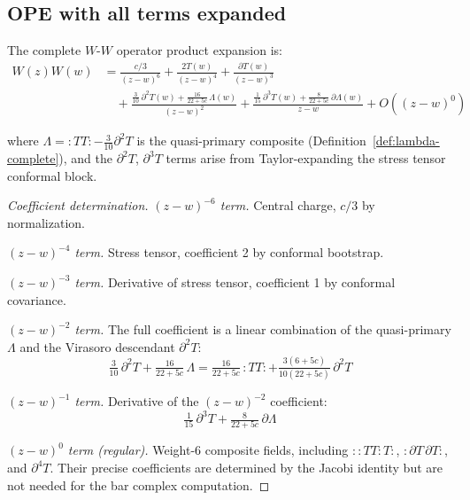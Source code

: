 \subsection{OPE with all terms expanded}
\label{subsec:w-w-ope-complete-expanded}

\begin{theorem}\label{thm:w-w-ope-complete}
The complete $W$-$W$ operator product expansion is:
\begin{align}
W(z)W(w) &= \frac{c/3}{(z-w)^6} + \frac{2T(w)}{(z-w)^4} + \frac{\partial T(w)}{(z-w)^3}
\nonumber \\
&\quad + \frac{\tfrac{3}{10}\,\partial^2 T(w) + \tfrac{16}{22+5c}\,\Lambda(w)}{(z-w)^2}
+ \frac{\tfrac{1}{15}\,\partial^3 T(w) + \tfrac{8}{22+5c}\,\partial\Lambda(w)}{z-w} + O((z-w)^0)
\label{eq:w-w-ope-full}
\end{align}

where $\Lambda = {:}TT{:} - \tfrac{3}{10}\partial^2 T$ is the quasi-primary composite (Definition~\ref{def:lambda-complete}), and the $\partial^2 T$, $\partial^3 T$ terms arise from Taylor-expanding the stress tensor conformal block.
\end{theorem}

\begin{proof}[Coefficient determination]

\emph{$(z-w)^{-6}$ term.} Central charge, $c/3$ by normalization.

\emph{$(z-w)^{-4}$ term.} Stress tensor, coefficient 2 by conformal bootstrap.

\emph{$(z-w)^{-3}$ term.} Derivative of stress tensor, coefficient 1 by conformal covariance.

\emph{$(z-w)^{-2}$ term.} The full coefficient is a linear combination of the quasi-primary $\Lambda$ and the Virasoro descendant $\partial^2 T$:
\[\tfrac{3}{10}\,\partial^2 T + \tfrac{16}{22+5c}\,\Lambda = \tfrac{16}{22+5c}\,{:}TT{:} + \tfrac{3(6+5c)}{10(22+5c)}\,\partial^2 T\]

\emph{$(z-w)^{-1}$ term.} Derivative of the $(z-w)^{-2}$ coefficient:
\[\tfrac{1}{15}\,\partial^3 T + \tfrac{8}{22+5c}\,\partial\Lambda\]

\emph{$(z-w)^{0}$ term (regular).} Weight-6 composite fields, including $:{:}TT{:}T{:}$, ${:}\partial T\, \partial T{:}$, and $\partial^4 T$.  Their precise coefficients are determined by the Jacobi identity but are not needed for the bar complex computation.
\end{proof}

